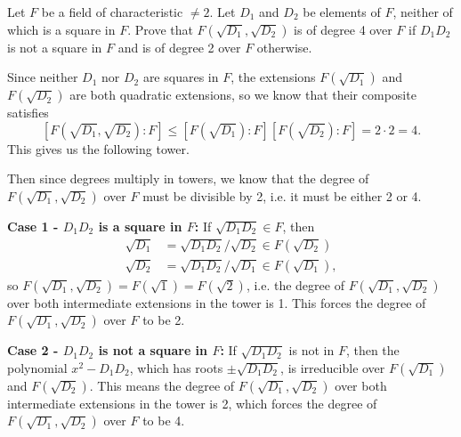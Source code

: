 \documentclass[10pt]{report}
\begin{document}

\begin{exer}[DF 13.2: 8]
	Let $F$ be a field of characteristic $\neq 2$. Let $D_1$ and $D_2$ be elements of $F$, neither of which is a square in $F$. Prove that $F(\sqrt{D_1} , \sqrt{D_2} )$ is of degree 4 over $F$ if $D_1D_2$ is not a square in $F$ and is of degree 2 over $F$ otherwise.
\end{exer}
Since neither $D_1$ nor $D_2$ are squares in $F$, the extensions $F(\sqrt{D_1} )$ and $F(\sqrt{D_2} )$ are both quadratic extensions, so we know that their composite satisfies
\[
	\left[ F(\sqrt{D_1} ,\sqrt{D_2} ):F \right]\leq \left[F(\sqrt{D_1} ):F\right]\left[F(\sqrt{D_2}) :F\right] = 2 \cdot 2 = 4.
\] This gives us the following tower.
\begin{center}
\end{center}
Then since degrees multiply in towers, we know that the degree of $F(\sqrt{D_1} ,\sqrt{D_2} )$ over $F$ must be divisible by 2, i.e. it must be either 2 or 4.

\textbf{Case 1 - $D_1D_2$ is a square in $F$:} If $\sqrt{D_1D_2} \in F$, then
\begin{align*}
	\sqrt{D_1} &=\sqrt{D_1D_2} /\sqrt{D_2} \in F(\sqrt{D_2} ) \\
	\sqrt{D_2} &=\sqrt{D_1D_2} / \sqrt{D_1} \in F(\sqrt{D_1} ),
\end{align*}
so $F(\sqrt{D_1} ,\sqrt{D_2} )=F(\sqrt{1} )=F(\sqrt{2} )$, i.e. the degree of $F(\sqrt{D_1} ,\sqrt{D_2} )$ over both intermediate extensions in the tower is 1. This forces the degree of $F(\sqrt{D_1} ,\sqrt{D_2} )$ over $F$ to be 2.

\textbf{Case 2 - $D_1D_2$ is not a square in $F$:} If $\sqrt{D_1D_2} $ is not in $F$, then the polynomial $x^2-D_1D_2$, which has roots $\pm \sqrt{D_1D_2}$, is irreducible over $F(\sqrt{D_1} )$ and $F(\sqrt{D_2} )$. This means the degree of $F(\sqrt{D_1} ,\sqrt{D_2} )$ over both intermediate extensions in the tower is 2, which forces the degree of $F(\sqrt{D_1} ,\sqrt{D_2} )$ over $F$ to be 4.
\end{document}
